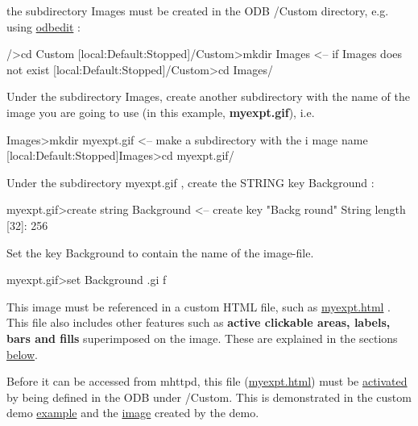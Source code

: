 \begin{DoxyEnumerate}
\item the subdirectory Images must be created in the ODB /Custom directory, e.g. using \hyperlink{RC_odbedit_utility}{odbedit} :


\begin{DoxyCode}
/>cd Custom
[local:Default:Stopped]/Custom>mkdir Images  <-- if Images does not exist
[local:Default:Stopped]/Custom>cd Images/
\end{DoxyCode}



\item Under the subdirectory Images, create another subdirectory with the name of the image you are going to use (in this example, {\bfseries myexpt.gif}), i.e.


\begin{DoxyCode}
Images>mkdir myexpt.gif <-- make a subdirectory with the i
      mage name
[local:Default:Stopped]Images>cd myexpt.gif/
\end{DoxyCode}



\item Under the subdirectory  myexpt.gif , create the STRING key  Background : 
\begin{DoxyCode}
myexpt.gif>create string Background  <-- create key "Backg
      round" 
String length [32]: 256
\end{DoxyCode}



\item Set the key  Background to contain the name of the image-\/file. 
\begin{DoxyCode}
myexpt.gif>set Background \midas\examples\custom\myexpt.gi
      f
\end{DoxyCode}
 
\end{DoxyEnumerate}

This image must be referenced in a custom HTML file, such as \hyperlink{myexpt_8html}{myexpt.html} . This file also includes other features such as {\bfseries active clickable areas, labels, bars and fills} superimposed on the image. These are explained in the sections \hyperlink{RC_mhttpd_Image_access_RC_mhttpd_custom_Labels_Bars_Fills}{below}.

Before it can be accessed from mhttpd, this file (\hyperlink{myexpt_8html}{myexpt.html}) must be \hyperlink{RC_mhttpd_Activate}{activated} by being defined in the ODB under /Custom. This is demonstrated in the custom demo \hyperlink{RC_mhttpd_custom_demo}{example} and the \hyperlink{RC_mhttpd_custom_demo_example_image_all}{image} created by the demo.

